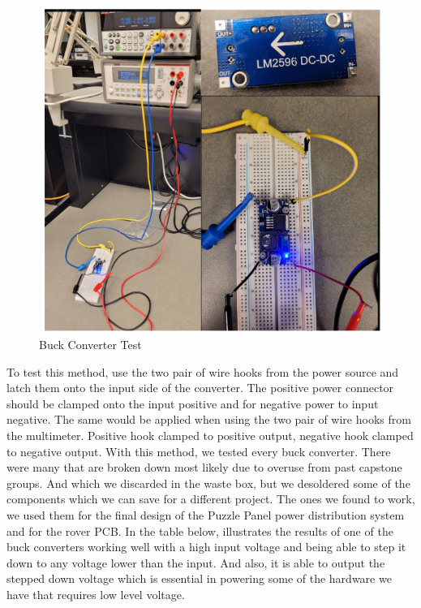 \documentclass[a4paper, 10pt]{article}
\begin{document}
\begin{figure} [!h]
			\centering
			\includegraphics[scale=0.7]{LM2956 Testing Picture}
			\caption{Buck Converter Test}
			\label{buck_test}
		\end{figure}

	To test this method, use the two pair of wire hooks from the power source and latch them onto the input side of the converter. The positive power connector should be clamped onto the input positive and for negative power to input negative. The same would be applied when using the two pair of wire hooks from the multimeter. Positive hook clamped to positive output, negative hook clamped to negative output. With this method, we tested every buck converter. There were many that are broken down most likely due to overuse from past capstone groups. And which we discarded in the waste box, but we desoldered some of the components which we can save for a different project. The ones we found to work, we used them for the final design of the Puzzle Panel power distribution system and for the rover PCB. In the table below, illustrates the results of one of the buck converters working well with a high input voltage and being able to step it down to any voltage lower than the input. And also, it is able to output the stepped down voltage which is essential in powering some of the hardware we have that requires low level voltage.
\end{document}

